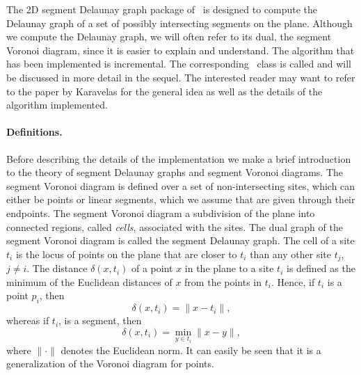 The 2D segment Delaunay graph package of \cgal\ is designed to
compute the Delaunay graph of a set of possibly intersecting segments
on the plane. Although we compute the Delaunay graph, we 
will often refer to its dual, the segment Voronoi diagram, since it is
easier to explain and understand. The algorithm that has been
implemented is incremental. The corresponding \cgal\ class is called
and will be discussed in more detail in the sequel. The interested
reader may want to refer to the paper by Karavelas
\cite{cgal:k-reisv-04} for the general idea as well as the details of
the algorithm implemented.

\paragraph{Definitions.}
Before describing the details of the implementation we make a brief
introduction to the theory of segment Delaunay graphs and segment
Voronoi diagrams.
The segment Voronoi diagram is defined over a set of non-intersecting
sites, which can either be points or linear segments, which we assume
that are given through their endpoints. The segment Voronoi diagram a
subdivision of the plane into connected regions, called {\em cells},
associated with the sites. The dual graph of the segment Voronoi
diagram is called the segment Delaunay graph. The cell of a site $t_i$
is the locus of points on the plane that are closer to $t_i$ than any
other site $t_j$, $j\neq i$.
The distance $\delta(x, t_i)$ of a point $x$ in the plane to a 
site $t_i$ is defined as the minimum of the Euclidean distances of $x$
from the points in $t_i$. Hence, if $t_i$ is a point $p_i$, then
\[      \delta(x,t_i)=\|x-t_i\|,  \]
whereas if $t_i$, is a segment, then
\[      \delta(x,t_i)=\min_{y\in t_i}\|x-y\|, \]
where $\|\cdot\|$ denotes the Euclidean norm.
It can easily be seen that it is a generalization of the Voronoi
diagram for points.

